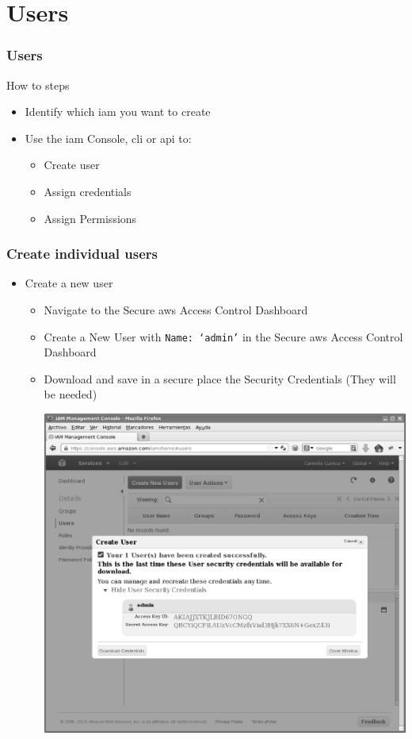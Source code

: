 \documentclass{beamer}
\begin{document}
\section{Users}
\begin{frame}[fragile]
\frametitle{Users}
How to steps
\begin{itemize}
 \item Identify which \acrshort{iam} you want to create
 \item Use the \acrshort{iam} Console, \acrfull{cli} or \acrfull{api} to:
  \begin{itemize}
 \item Create user
 \item Assign credentials
 \item Assign Permissions
\end{itemize}
\end{itemize}
\end{frame}
\begin{frame}[fragile]
\frametitle{Create individual users}
\begin{itemize}
\item Create a new user
\begin{itemize}
 \item Navigate to the Secure \acrshort{aws} Access Control Dashboard 
 \item Create a New User with \texttt{Name: `admin'} in the Secure \acrshort{aws} Access Control Dashboard
 \item Download and save in a secure place the Security Credentials (They will be needed)
 \begin{center}
 \includegraphics[scale=0.10]{credentials.eps}
 \end{center}
\end{itemize}
\end{itemize}
\end{frame}
\end{document}
